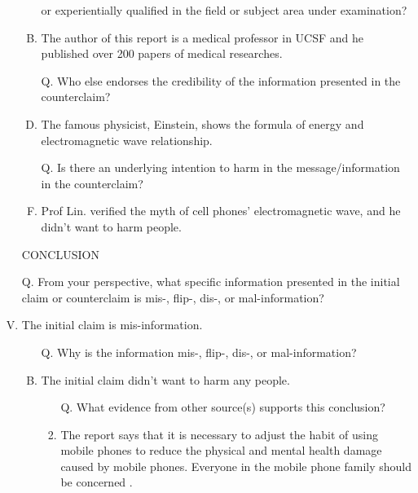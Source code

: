 \documentclass[a4paper, 12pt]{article}
\begin{document}
\begin{CJK*}{UTF8}{bsmi}
\begin{enumerate}[I.]
\begin{enumerate}[A.]
                              or experientially qualified in the field or subject area under examination?
                        \item The author of this report \parencite{20210822} is a medical professor in UCSF and he published over 200 papers of medical
                              researches.
                        \item [Q.] Who else endorses the credibility of the information presented in the {\color{red}counterclaim}?
                        \item The famous physicist, Einstein, shows the formula of energy and electromagnetic wave relationship.
                        \item [Q.] Is there an underlying intention to harm in the message/information in the {\color{red}counterclaim}?
                        \item Prof Lin. verified the myth of cell phones' electromagnetic wave, and he didn't want to harm people.
                  \end{enumerate}
            \item [] %
            \item [] CONCLUSION
            \item [Q.] From your perspective, what specific information presented in the {\color{blue}initial claim} or {\color{red}counterclaim}
                  is {\color{blue} mis}-, {\color{blue}flip}-, {\color{blue}dis}-, or {\color{blue}mal}-information?
            \item The {\color{blue}initial claim} is {\color{blue} mis}-information.
                  \begin{enumerate}[A.]
                        \item [Q.] Why is the information {\color{blue} mis}-, {\color{blue}flip}-, {\color{blue}dis}-, or {\color{blue}mal}-information?
                        \item The initial claim didn't want to harm any people.
                              \begin{enumerate}[1.]
                                    \item [Q.] What evidence from other source(s) supports this conclusion?
                                    \item The report says that it is necessary to adjust the habit of using mobile
                                          phones to reduce the physical and mental health damage caused by mobile phones.
                                          Everyone in the mobile phone family should be concerned \parencite{AIA970701}.

\end{enumerate}
\end{enumerate}
\end{enumerate}
\end{CJK*}
\end{document}
